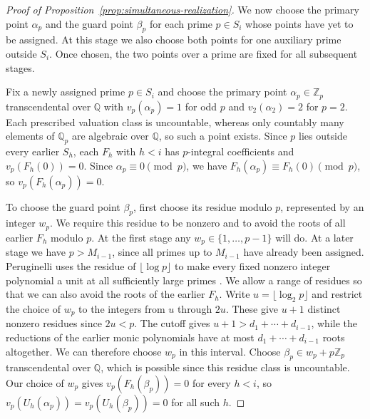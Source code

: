 \documentclass{article}
\theoremstyle{remark}
\begin{document}
\begin{proof}[Proof of Proposition~\ref{prop:simultaneous-realization}]
    We now choose the primary point $\alpha_p$ and the guard point $\beta_p$ for each prime $p \in S_i$ whose points have yet to be assigned.
    At this stage we also choose both points for one auxiliary prime outside $S_i$.
    Once chosen, the two points over a prime are fixed for all subsequent stages.

    Fix a newly assigned prime $p \in S_i$ and choose the primary point $\alpha_p \in \mathbb{Z}_p$ transcendental over $\mathbb{Q}$ with $v_p(\alpha_p) = 1$ for odd $p$ and $v_2(\alpha_2) = 2$ for $p = 2$.
    Each prescribed valuation class is uncountable, whereas only countably many elements of $\mathbb{Q}_p$ are algebraic over $\mathbb{Q}$, so such a point exists.
    Since $p$ lies outside every earlier $S_h$, each $F_h$ with $h < i$ has $p$-integral coefficients and $v_p(F_h(0)) = 0$.
    Since $\alpha_p \equiv 0 \pmod{p}$, we have $F_h(\alpha_p) \equiv F_h(0) \pmod{p}$, so $v_p(F_h(\alpha_p)) = 0$.

    To choose the guard point $\beta_p$, first choose its residue modulo $p$, represented by an integer $w_p$.
    We require this residue to be nonzero and to avoid the roots of all earlier $F_h$ modulo $p$.
    At the first stage any $w_p \in \{1, \ldots, p - 1\}$ will do.
    At a later stage we have $p > M_{i - 1}$, since all primes up to $M_{i - 1}$ have already been assigned.
    Peruginelli uses the residue of $\lfloor \log p \rfloor$ to make every fixed nonzero integer polynomial a unit at all sufficiently large primes \cite[proof of Theorem~3.1]{Peruginelli}.
    We allow a range of residues so that we can also avoid the roots of the earlier $F_h$.
    Write $u = \lfloor \log_2 p \rfloor$ and restrict the choice of $w_p$ to the integers from $u$ through $2u$.
    These give $u + 1$ distinct nonzero residues since $2u < p$.
    The cutoff gives $u + 1 > d_1 + \cdots + d_{i - 1}$, while the reductions of the earlier monic polynomials have at most $d_1 + \cdots + d_{i - 1}$ roots altogether.
    We can therefore choose $w_p$ in this interval.
    Choose $\beta_p \in w_p + p\mathbb{Z}_p$ transcendental over $\mathbb{Q}$, which is possible since this residue class is uncountable.
    Our choice of $w_p$ gives $v_p(F_h(\beta_p)) = 0$ for every $h < i$, so $v_p(U_h(\alpha_p)) = v_p(U_h(\beta_p)) = 0$ for all such $h$.


\end{proof}
\end{document}

